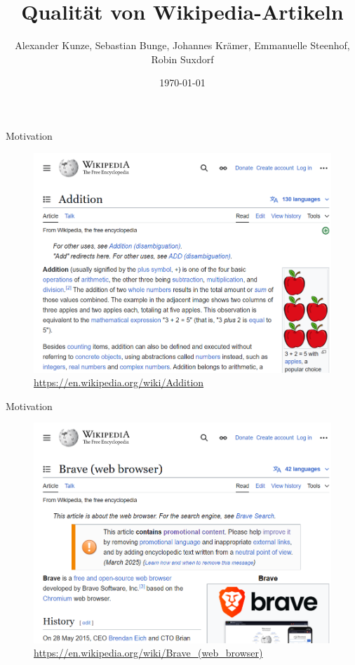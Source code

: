 \documentclass[aspectratio=169]{beamer} %
\title{Qualität von Wikipedia-Artikeln}
\author[Kunze, Bunge, Krämer, Steenhof, Suxdorf]{Alexander Kunze, Sebastian Bunge, Johannes Krämer, Emmanuelle Steenhof, Robin Suxdorf}
\institute{Artificial Intelligence Group,\\
University of Hagen, Germany}
\date{\today}
\begin{document}




\begin{frame}
    \titlepage
\end{frame}
\nologo

\begin{frame}{Motivation}
    \begin{figure}
        \centering
        \includegraphics[width=0.6\linewidth]{figures/wp-screenshot-good.png}
        \caption{\url{https://en.wikipedia.org/wiki/Addition}}
    \end{figure}
\end{frame}

\begin{frame}{Motivation}
    \begin{figure}
        \centering
        \includegraphics[width=0.6\linewidth]{figures/wp-screenshot-promo.png}
        \caption{\url{https://en.wikipedia.org/wiki/Brave_(web_browser)}}
    \end{figure}
\end{frame}
\end{document}
